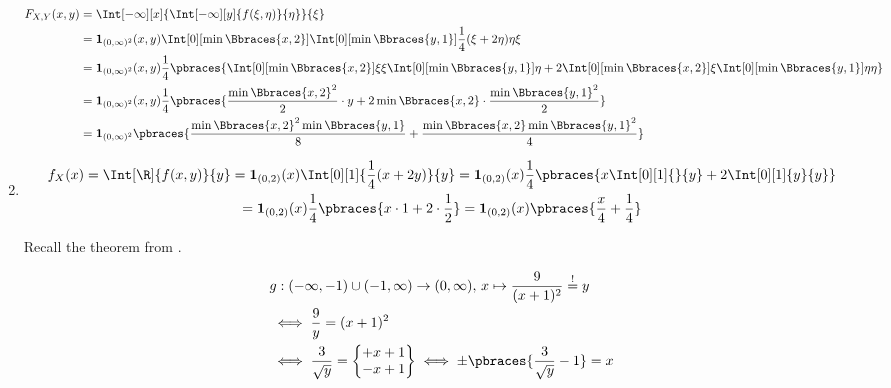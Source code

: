 \begin{solution}
\begin{enumerate}[label = (\alph*)]
    \begin{align*}
        F_{X, Y}(x, y)
        & =
        \Int[-\infty][x]
        {
            \Int[-\infty][y]
            {
                f(\xi, \eta)
            }{\eta}
        }{\xi} \\
        & =
        \mathbf 1_{(0, \infty)^2}(x, y)
        \Int[0][\min \Bbraces{x, 2}]
        {
            \Int[0][\min \Bbraces{y, 1}]
            {
                \frac{1}{4}
                (\xi + 2 \eta)
            }{\eta}
        }{\xi} \\
        & =
        \mathbf 1_{(0, \infty)^2}(x, y)
        \frac{1}{4}
        \pbraces
        {
            \Int[0][\min \Bbraces{x, 2}]{\xi}{\xi}
            \Int[0][\min \Bbraces{y, 1}]{}{\eta}
            +
            2
            \Int[0][\min \Bbraces{x, 2}]{}{\xi}
            \Int[0][\min \Bbraces{y, 1}]{\eta}{\eta}
        } \\
        & =
        \mathbf 1_{(0, \infty)^2}(x, y)
        \frac{1}{4}
        \pbraces
        {
            \frac{\min \Bbraces{x, 2}^2}{2} \cdot y
            +
            2 \min \Bbraces{x, 2} \cdot \frac{\min \Bbraces{y, 1}^2}{2}
        } \\
        & =
        \mathbf 1_{(0, \infty)^2}
        \pbraces
        {
            \frac{\min \Bbraces{x, 2}^2 \min \Bbraces{y, 1}}{8}
            +
            \frac{\min \Bbraces{x, 2} \min \Bbraces{y, 1}^2}{4}
        }
    \end{align*}

    \item

    \begin{multline*}
        f_X(x)
        =
        \Int[\R]{f(x, y)}{y}
        =
        \mathbf 1_{(0, 2)}(x) \Int[0][1]{\frac{1}{4} (x + 2 y)}{y}
        =
        \mathbf 1_{(0, 2)}(x)
        \frac{1}{4}
        \pbraces
        {
            x \Int[0][1]{}{y}
            +
            2 \Int[0][1]{y}{y}
        } \\
        =
        \mathbf 1_{(0, 2)}(x) \frac{1}{4} \pbraces{x \cdot 1 + 2 \cdot \frac{1}{2}}
        =
        \mathbf 1_{(0, 2)}(x)
        \pbraces
        {
            \frac{x}{4}
            +
            \frac{1}{4}
        }
    \end{multline*}

    Recall the theorem from \cite[Lecture 3, Slide 38]{EStat}.

    \begin{align*}
        &
        g:
            (-\infty, -1) \cup (-1, \infty) \to (0, \infty), \,
            x \mapsto \frac{9}{(x + 1)^2} \stackrel{!}{=} y \\
        & \iff
        \frac{9}{y} = (x + 1)^2 \\
        & \iff
        \frac{3}{\sqrt y}
        =
        \begin{Bmatrix}
            +x + 1 \\
            -x + 1
        \end{Bmatrix}
        \iff
        \pm \pbraces{\frac{3}{\sqrt y} - 1} = x
    \end{align*}


\end{enumerate}
\end{solution}

